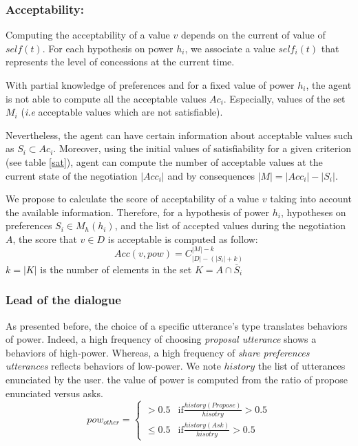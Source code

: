 \documentclass[sigconf]{aamas}  %
\begin{document}
	\subsubsection{Acceptability:}
	Computing the acceptability of a value $v$ depends on the current of value of $self(t)$. For each hypothesis on power $h_i$, we associate a value $self_i(t)$ that represents the level of concessions at the current time. 
	
	With partial knowledge of preferences and for a fixed value of power $h_i$, the agent is not able to compute all the acceptable values $Ac_i$. Especially,   values of the set $M_i$ (\emph{i.e} acceptable values which are not satisfiable). 
	
	Nevertheless, the agent can have certain information about acceptable values such as $ S_i \subset Ac_i$. Moreover, using the initial values of satisfiability for a given criterion (see table \ref{sat}), agent can compute the number of acceptable values at the current state of the negotiation $|Acc_i|$ and by consequences $|M| = |Acc_i| - |S_i|$. 
	
	We propose to calculate the score of acceptability of a value $v$ taking into account the available information. Therefore, for a hypothesis of power $h_i$, hypotheses on preferences $S_i \in M_h(h_i)$,  and the list of accepted values during the negotiation $A$, the score that $v \in D$ is acceptable is computed as follow: 
	\begin{equation}
	Acc(v, pow) = C_{|D|-(|S_i| + k)}^{|M| - k}
	\end{equation}
	$k = |K| $ is the number of elements in the set $K = A \cap \overline S_i$
	
	
	\subsubsection{Lead of the dialogue}		
	As presented before, the choice of a specific utterance's type translates behaviors of power. Indeed, a high frequency of choosing \emph{proposal utterance} shows a behaviors of high-power. Whereas, a high frequency of \emph{share preferences utterances} reflects behaviors of low-power.
	We note $history$ the list of utterances enunciated by the user. the value of power is computed from the ratio of propose enunciated versus asks.
	\begin{equation}
	pow_{other} = \left\{\begin{array}{ll}
	> 0.5 & \mathrm{if } \frac{history(Propose)}{hisotry} > 0.5\\
	\leq 0.5 & \mathrm{if  } \frac{history(Ask)}{hisotry} > 0.5
	\end{array}\right.
	\end{equation}
	
\end{document}
